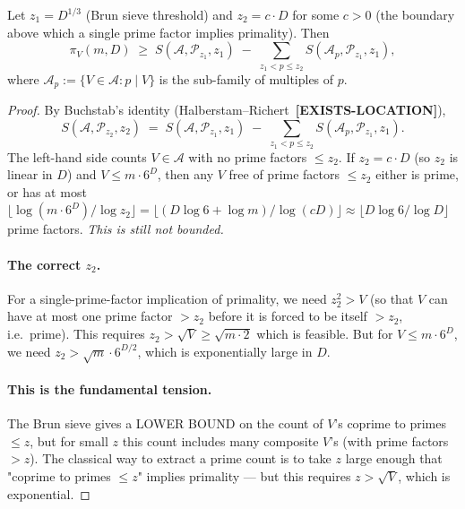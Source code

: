 \begin{theorem}
\label{thm:buchstab}
Let $z_{1} = D^{1/3}$ (Brun sieve threshold) and $z_{2} = c \cdot D$
for some $c > 0$ (the boundary above which a single prime factor
implies primality). Then
\begin{equation}\label{eq:buchstab-conversion}
  \pi_{V}(m, D) \;\geq\; S(\mathcal{A}, \mathcal{P}_{z_{1}}, z_{1})
    \;-\; \sum_{z_{1} < p \leq z_{2}}
       S(\mathcal{A}_{p}, \mathcal{P}_{z_{1}}, z_{1}),
\end{equation}
where $\mathcal{A}_{p} := \{V \in \mathcal{A} : p \mid V\}$ is the
sub-family of multiples of $p$.
\end{theorem}

\begin{proof}
By Buchstab's identity (Halberstam--Richert~\cite[\S2.3, eq.~(2.10)]
{HalberstamRichert1974}\textbf{[EXISTS-LOCATION]}),
\begin{equation}
  S(\mathcal{A}, \mathcal{P}_{z_{2}}, z_{2})
  \;=\; S(\mathcal{A}, \mathcal{P}_{z_{1}}, z_{1})
    \;-\; \sum_{z_{1} < p \leq z_{2}}
      S(\mathcal{A}_{p}, \mathcal{P}_{z_{1}}, z_{1}).
\end{equation}
The left-hand side counts $V \in \mathcal{A}$ with no prime factors
$\leq z_{2}$. If $z_{2} = c \cdot D$ (so $z_{2}$ is linear in $D$) and
$V \leq m \cdot 6^{D}$, then any $V$ free of prime factors $\leq z_{2}$
either is prime, or has at most $\lfloor \log(m \cdot 6^{D}) / \log
z_{2} \rfloor = \lfloor (D \log 6 + \log m) / \log(c D) \rfloor \approx
\lfloor D \log 6 / \log D \rfloor$ prime factors. \emph{This is still
not bounded.}

\paragraph{The correct $z_{2}$.} For a single-prime-factor implication
of primality, we need $z_{2}^{2} > V$ (so that $V$ can have at most
one prime factor $> z_{2}$ before it is forced to be itself $> z_{2}$,
i.e.\ prime). This requires $z_{2} > \sqrt{V} \geq \sqrt{m \cdot 2}$
which is feasible. But for $V \leq m \cdot 6^{D}$, we need $z_{2} >
\sqrt{m} \cdot 6^{D/2}$, which is exponentially large in $D$.

\paragraph{This is the fundamental tension.} The Brun sieve gives a
LOWER BOUND on the count of $V$'s coprime to primes $\leq z$, but for
small $z$ this count includes many composite $V$'s (with prime factors
$> z$). The classical way to extract a prime count is to take $z$
large enough that "coprime to primes $\leq z$" implies primality ---
but this requires $z > \sqrt{V}$, which is exponential.


\end{proof}
